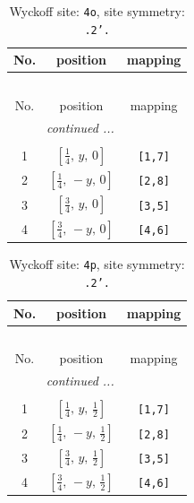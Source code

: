 \documentclass[fleqn,8pt]{jsarticle}
\begin{document}
\renewcommand{\arraystretch}{1.2}
\begin{longtable}{ccc}
\caption{Wyckoff site: {\tt 4o}, site symmetry: {\tt .2'.}}
 \\
 \hline \hline
No. & position & mapping \\ \hline \endfirsthead

\multicolumn{2}{l}{\tablename\ \thetable{}} \\
 \hline \hline
No. & position & mapping \\ \hline \endhead

 \hline \hline
\multicolumn{2}{r}{\footnotesize\it continued ...} \\ \endfoot

 \hline \hline
\multicolumn{2}{r}{} \\ \endlastfoot

1 & $\left[ \frac{1}{4},\, y,\, 0 \right]$ & {\tt [1,7]} \\ \hline
2 & $\left[ \frac{1}{4},\, - y,\, 0 \right]$ & {\tt [2,8]} \\ \hline
3 & $\left[ \frac{3}{4},\, y,\, 0 \right]$ & {\tt [3,5]} \\ \hline
4 & $\left[ \frac{3}{4},\, - y,\, 0 \right]$ & {\tt [4,6]} \\
\end{longtable}
\renewcommand{\arraystretch}{1.2}
\begin{longtable}{ccc}
\caption{Wyckoff site: {\tt 4p}, site symmetry: {\tt .2'.}}
 \\
 \hline \hline
No. & position & mapping \\ \hline \endfirsthead

\multicolumn{2}{l}{\tablename\ \thetable{}} \\
 \hline \hline
No. & position & mapping \\ \hline \endhead

 \hline \hline
\multicolumn{2}{r}{\footnotesize\it continued ...} \\ \endfoot

 \hline \hline
\multicolumn{2}{r}{} \\ \endlastfoot

1 & $\left[ \frac{1}{4},\, y,\, \frac{1}{2} \right]$ & {\tt [1,7]} \\ \hline
2 & $\left[ \frac{1}{4},\, - y,\, \frac{1}{2} \right]$ & {\tt [2,8]} \\ \hline
3 & $\left[ \frac{3}{4},\, y,\, \frac{1}{2} \right]$ & {\tt [3,5]} \\ \hline
4 & $\left[ \frac{3}{4},\, - y,\, \frac{1}{2} \right]$ & {\tt [4,6]} \\
\end{longtable}
\end{document}
